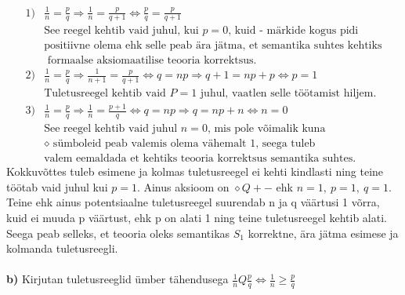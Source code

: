 \documentclass{article}
\begin{document}
\begin{equation*}
\begin{aligned}
1)& \frac{1}{n}=\frac{p}{q}\Rightarrow\frac{1}{n}=\frac{p}{q+1}\Leftrightarrow\frac{p}{q}=\frac{p}{q+1}\\
&\text{See reegel kehtib vaid juhul, kui }p=0\text{, kuid - m\"arkide kogus pidi}\\
&\text{positiivne olema ehk selle peab \"ara j\"atma, et semantika suhtes kehtiks}\\
&\text{ formaalse aksiomaatilise teooria korrektsus.}\\
2)& \frac{1}{n}=\frac{p}{q}\Rightarrow\frac{1}{n+1}=\frac{p}{q+1}\Leftrightarrow q=np\Rightarrow q+1=np+p\Leftrightarrow p=1\\
&\text{Tuletusreegel kehtib vaid }P=1\text{ juhul, vaatlen selle t\"o\"otamist hiljem.}\\
3)& \frac{1}{n}=\frac{p}{q}\Rightarrow\frac{1}{n}=\frac{p+1}{q}\Leftrightarrow q=np\Rightarrow q=np+n\Leftrightarrow n=0\\
&\text{See reegel kehtib vaid juhul }n=0\text{, mis pole v\~oimalik kuna }\\
&\diamond\text{ s\"umboleid peab valemis olema v\"ahemalt 1, seega tuleb}\\
&\text{valem eemaldada et kehtiks teooria korrektsus semantika suhtes.}
\end{aligned}
\end{equation*}
Kokkuv\~ottes tuleb esimene ja kolmas tuletusreegel ei kehti kindlasti ning teine t\"o\"otab vaid juhul kui $p=1$. Ainus aksioom on $\diamond Q+-$ ehk $n=1,\ p=1,\ q=1$. Teine ehk ainus potentsiaalne tuletusreegel suurendab n ja q v\"a\"artusi 1 v\~orra, kuid ei muuda p v\"a\"artust, ehk p on alati 1 ning teine tuletusreegel kehtib alati. Seega peab selleks, et teooria oleks semantikas $S_1$ korrektne, \"ara j\"atma esimese ja kolmanda tuletusreegli. \\\pagebreak\\
\textbf{b)} Kirjutan tuletusreeglid \"umber t\"ahendusega $\frac{1}{n}Q\frac{p}{q}\Leftrightarrow\frac{1}{n}\geq\frac{p}{q}$ \\
\end{document}
